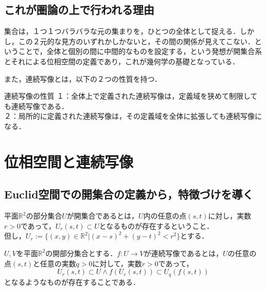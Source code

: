\documentclass[uplatex, 12pt, a4paper, dvipdfmx]{jsarticle}
\begin{document}
\subsection{これが圏論の上で行われる理由}

集合は，１つ１つバラバラな元の集まりを，ひとつの全体として捉える．しかし，この２元的な見方のいずれかしかないと，その間の関係が見えてこない．ということで，全体と個別の間に中間的なものを設定する，という発想が開集合系とそれによる位相空間の定義であり，これが幾何学の基礎となっている．\par

また，連続写像とは，以下の２つの性質を持つ．
\begin{itembox}[l]{連続写像の性質}
    １：全体上で定義された連続写像は，定義域を狭めて制限しても連続写像である．\\
    ２：局所的に定義された連続写像は，その定義域を全体に拡張しても連続写像になる．
\end{itembox}

\section{位相空間と連続写像}

\subsection{Euclid空間での開集合の定義から，特徴づけを導く}

\begin{shadebox}\begin{definition}
    平面$\mathbb{R}^2$の部分集合$U$が開集合であるとは，$U$内の任意の点$(s,t)$に対し，実数$r>0$であって，$U_r(s,t)\subset U$となるものが存在するということ．\\
    但し，$U_r := \{ (x,y)\in\mathbb{R}^2 | (x-s)^2 + (y-t)^2 < r^2 \}$とする．
\end{definition}\end{shadebox}

\begin{shadebox}\begin{definition}
    $U,V$を平面$\mathbb{R}^2$の開部分集合とする．$f:U\longrightarrow V$が連続写像であるとは，$U$の任意の点$(s,t)$と任意の実数$q>0$に対して，実数$r>0$であって，$$U_r(s,t)\subset U \wedge f(U_r(s,t))\subset U_q(f(s,t))$$となるようなものが存在することである．
\end{definition}\end{shadebox}
\end{document}

